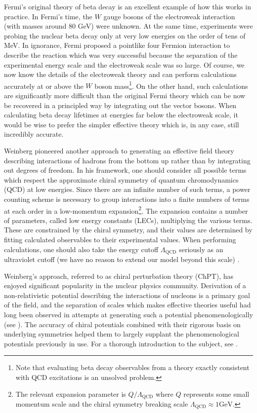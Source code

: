 Fermi's original theory of beta decay is an excellent example of how this works in practice. In Fermi's time, the $W$ gauge bosons of the electroweak interaction (with masses around 80 GeV) were unknown. At the same time, experiments were probing the nuclear beta decay only at very low energies on the order of tens of MeV. In ignorance, Fermi proposed a pointlike four Fermion interaction to describe the reaction which was very successful because the separation of the experimental energy scale and the electroweak scale was so large. Of course, we now know the details of the electroweak theory and can perform calculations accurately at or above the $W$ boson mass\footnote{Note that evaluating beta decay observables from a theory exactly consistent with QCD excitations is an unsolved problem.}. On the other hand, such calculations are significantly more difficult than the original Fermi theory which can be now be recovered in a principled way by integrating out the vector bosons. When calculating beta decay lifetimes at energies far below the electroweak scale, it would be wise to prefer the simpler effective theory which is, in any case, still incredibly accurate. 

Weinberg pioneered another approach to generating an effective field theory describing interactions of hadrons \cite{WEINBERG1990288} from the bottom up rather than by integrating out degrees of freedom. In his framework, one should consider all possible terms which respect the approximate chiral symmetry of quantum chromodynamics (QCD) at low energies. Since there are an infinite number of such terms, a power counting scheme is necessary to group interactions into a finite numbers of terms at each order in a low-momentum expansion\footnote{The relevant expansion parameter is $Q/\Lambda_{\text{QCD}}$ where $Q$ represents some small momentum scale and the chiral symmetry breaking scale $\Lambda_{\text{QCD}}\approx 1\text{GeV}$.}. The expansion contains a number of parameters, called low energy constants (LECs), multiplying the various terms. These are constrained by the chiral symmetry, and their values are determined by fitting calculated observables to their experimental values. When performing calculations, one should also take the energy cutoff $\Lambda_{\text{QCD}}$ seriously as an ultraviolet cutoff (we have no reason to extend our model beyond this scale) \cite{Epelbaum2013}. 

Weinberg's approach, referred to as chiral perturbation theory (ChPT), has enjoyed significant popularity in the nuclear physics community. Derivation of a non-relativistic potential describing the interactions of nucleons is a primary goal of the field, and the separation of scales which makes effective theories useful had long been observed in attempts at generating such a potential phenomenologically (see ). The accuracy of chiral potentials combined with their rigorous basis on underlying symmetries helped them to largely supplant the phenomenological potentials previously in use. For a thorough introduction to the subject, see \cite{Machleidt20111}.

